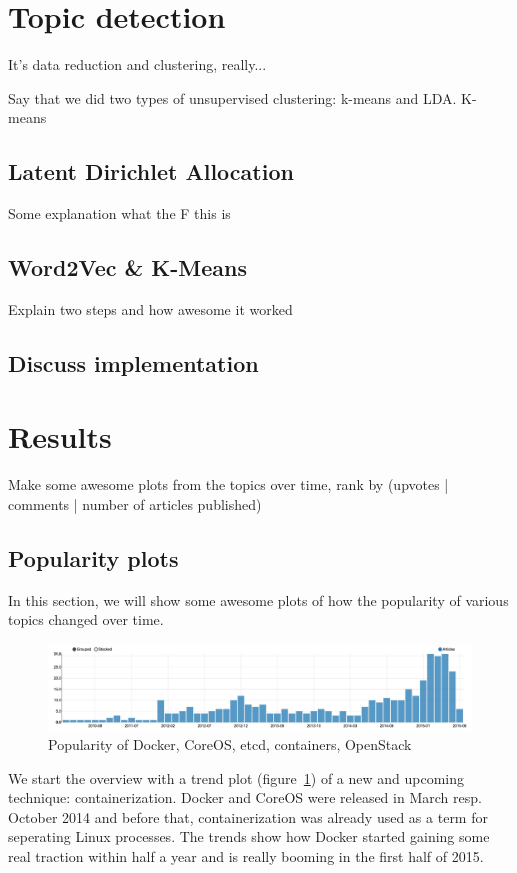 \section{Topic detection}
\label{sec:topic_detection}
It's data reduction and clustering, really...

Say that we did two types of unsupervised clustering: k-means and LDA. K-means

\subsection{Latent Dirichlet Allocation}
Some explanation what the F this is

\subsection{Word2Vec \& K-Means}
Explain two steps and how awesome it worked

\subsection{Discuss implementation}

\section{Results}
Make some awesome plots from the topics over time, rank by (upvotes | comments | number of articles published)

\subsection{Popularity plots}
In this section, we will show some awesome plots of how the popularity of various topics changed over time.

\begin{figure}[H]
	\caption{Popularity of Docker, CoreOS, etcd, containers, OpenStack}
	\label{fig:trend_docker}
	\centering
	\includegraphics[width=14cm]{topic_trends/docker}
\end{figure}
We start the overview with a trend plot (figure~\ref{fig:trend_docker}) of a new and upcoming technique: containerization. Docker and CoreOS were released in March resp. October 2014 and before that, containerization was already used as a term for seperating Linux processes. The trends show how Docker started gaining some real traction within half a year and is really booming in the first half of 2015.


